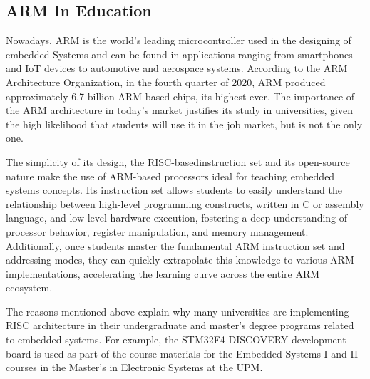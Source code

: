 \subsection{ARM In Education}
\label{chap:Back_ARM_Education}

Nowadays, ARM is the world's leading microcontroller used in the designing of 
embedded Systems and can be found in applications ranging from smartphones 
and IoT devices to automotive and aerospace systems. According to the ARM 
Architecture Organization, in the fourth quarter of 2020, ARM produced approximately 
6.7 billion ARM-based chips, its highest ever\cite{ArmRecord}. The importance of the ARM 
architecture in today's market justifies its study in universities, given the high likelihood 
that students will use it in the job market, but is not the only one.

The simplicity of its design, the RISC-basedinstruction set and its open-source 
nature make the use of ARM-based processors ideal for teaching embedded systems 
concepts. Its instruction set allows students to easily understand the relationship 
between high-level programming constructs, written in C or assembly 
language, and low-level hardware execution, fostering a deep understanding of 
processor behavior, register manipulation, and memory management. Additionally, 
once students master the fundamental ARM instruction set and addressing modes, 
they can quickly extrapolate this knowledge to various ARM implementations, 
accelerating the learning curve across the entire ARM ecosystem.

The reasons mentioned above explain why many universities are implementing 
RISC architecture in their undergraduate and master's degree programs related to 
embedded systems. For example, the STM32F4-DISCOVERY development board 
is used as part of the course materials for the Embedded Systems I and II courses 
in the Master's in Electronic Systems at the UPM.
